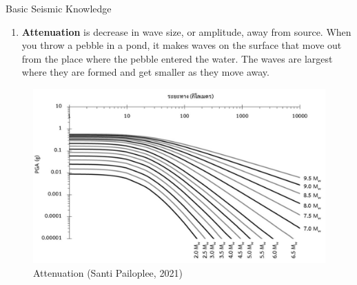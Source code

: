 \documentclass{beamer}
\newcounter{saveenumi}
\newcommand{\seti}{\setcounter{saveenumi}{\value{enumi}}}
\newcommand{\conti}{\setcounter{enumi}{\value{saveenumi}}}
\begin{document}
	\begin{frame}[t]{Basic Seismic Knowledge}
		\begin{enumerate}
			\conti
			\item \textbf{Attenuation} is decrease in wave size, or amplitude, away from source. When you 
			throw a pebble in a pond, it makes waves on the surface that move out from the place where 
			the pebble entered the water. The waves are largest where they are formed and get smaller as 
			they move away.
			\seti
		\end{enumerate}
	
		\begin{figure}
			\includegraphics[scale=0.35]{anu.jpg}
			\caption{Attenuation (Santi Pailoplee, 2021)}
		\end{figure}
	\end{frame}
\end{document}
